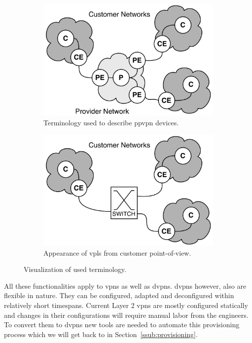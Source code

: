 \begin{figure}[!h]
	\centering
	\begin{subfigure}[h]{0.45\textwidth}
	\centering
		\includegraphics[width=\textwidth]{./includes/ppvpn.pdf}
		\caption{Terminology used to describe \acs{ppvpn} devices.}
		\label{fig:ppvpn}
	\end{subfigure}\hfill
	\begin{subfigure}[h]{0.45\textwidth}
	\centering
		\includegraphics[width=\textwidth]{./includes/ppvpn-cust.pdf}
		\caption{Appearance of \acs{vpls} from customer point-of-view.}
		\label{fig:ppvpn-cust}
	\end{subfigure}
	\caption{Visualization of used terminology.}
\end{figure}

All these functionalities apply to \acp{vpn} as well as \acp{dvpn}. \acp{dvpn} however, also are flexible in nature. They can be configured, adapted and deconfigured within relatively short timespans. Current Layer 2 \acp{vpn} are mostly configured statically and changes in their configurations will require manual labor from the engineers. To convert them to \acp{dvpn} new tools are needed to automate this provisioning process which we will get back to in Section~\ref{ssub:provisioning}.


